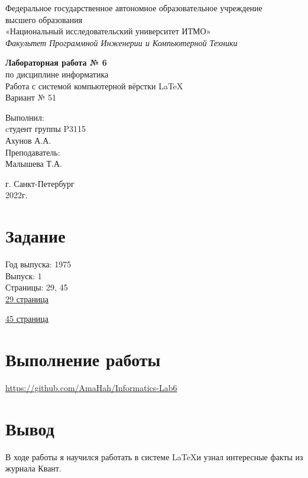 \thispagestyle{empty}
\begin{center}
    Федеральное государственное автономное образовательное учреждение\\ 
    высшего образования\\
    «Национальный исследовательский университет ИТМО»\\
    \textit{Факультет Программной Инженерии и Компьютерной Техники}\\
\end{center}
\vspace{2cm}
\begin{center}
    \large
    \textbf{Лабораторная работа № 6}\\
    по дисциплине информатика\\
    Работа с системой компьютерной вёрстки \LaTeX \\
    Вариант № 51
\end{center}
\vspace{7cm}
\begin{flushright}
    Выполнил:\\
    cтудент  группы P3115\\
    Ахунов А.А.\\
    Преподаватель: \\
    Малышева Т.А.\\
\end{flushright}
\vspace{6cm}
\begin{center}
    г. Санкт-Петербург\\
    2022г.
\end{center}
\newpage

\tableofcontents

\newpage

\section{Задание}
Год выпуска: 1975\\
Выпуск: 1\\
Страницы: 29, 45\\

\href{https://kvant.ras.ru/pages.html#1975&1&29}{29 страница}

\href{https://kvant.ras.ru/pages.html#1975&1&45}{45 страница}

\newpage

\section{Выполнение работы}
\url{https://github.com/AmaHah/Informatics-Lab6}
\newpage

\section{Вывод}
В ходе работы я научился работать в системе \LaTeX и узнал интересные факты из журнала Квант.
